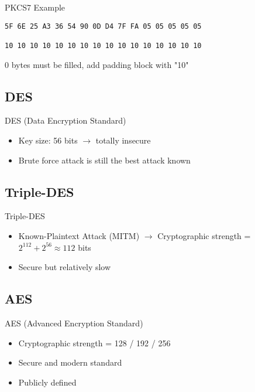 \begin{examplecode}{PKCS7 Example}\\
\begin{lstlisting}[language=text, style=basesmol]
5F 6E 25 A3 36 54 90 0D D4 7F FA 05 05 05 05 05

10 10 10 10 10 10 10 10 10 10 10 10 10 10 10 10
\end{lstlisting}

0 bytes must be filled, add padding block with "10"
\end{examplecode}

\subsection{DES}

\begin{definition}{DES (Data Encryption Standard)}\\
    \begin{itemize}
        \item Key size: 56 bits $\rightarrow$ totally insecure
        \item Brute force attack is still the best attack known
    \end{itemize}
\end{definition}

\subsection{Triple-DES}

\begin{concept}{Triple-DES}\\
    \begin{itemize}
        \item Known-Plaintext Attack (MITM) $\rightarrow$ Cryptographic strength = $2^{112} + 2^{56} \approx 112$ bits
        \item Secure but relatively slow
    \end{itemize}
\end{concept}


\subsection{AES}

\begin{concept}{AES (Advanced Encryption Standard)}\\
    \begin{itemize}
        \item Cryptographic strength = 128 / 192 / 256
        \item Secure and modern standard
        \item Publicly defined
    \end{itemize}
\end{concept}

